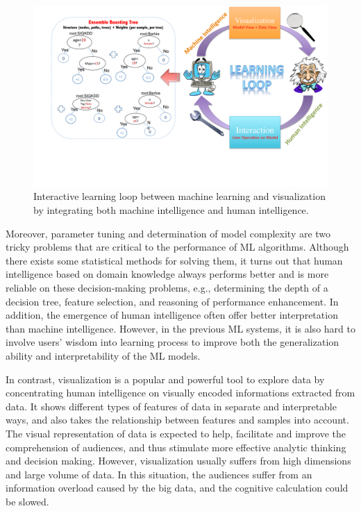 \documentclass{chi2009}
\begin{document}
\begin{figure}[tH!]
\begin{center}
 \includegraphics[width=0.9\linewidth]{loop.pdf}
\end{center}
   \caption{Interactive learning loop between machine learning and visualization by integrating both machine intelligence and human intelligence.}
\label{fig:system}
\end{figure} 

Moreover, parameter tuning and determination of model complexity are two tricky problems that are critical to the performance of ML algorithms. Although there exists some statistical methods for solving them, it turns out that human intelligence based on domain knowledge always performs better and is more reliable on these decision-making problems, e.g., determining the depth of a decision tree, feature selection, and reasoning of performance enhancement. In addition, the emergence of human intelligence often offer better interpretation than machine intelligence. However, in the previous ML systems, it is also hard to involve users’ wisdom into learning process to improve both the generalization ability and interpretability of the ML models. 

In contrast, visualization is a popular and powerful tool to explore data by concentrating human intelligence on visually encoded informations extracted from data. It shows different types of features of data in separate and interpretable ways, and also takes the relationship between features and samples into account. The visual representation of data is expected to help, facilitate and improve the comprehension of audiences, and thus stimulate more effective analytic thinking and decision making. However, visualization usually suffers from high dimensions and large volume of data. In this situation, the audiences suffer from an information overload caused by the big data, and the cognitive calculation could be slowed.
\end{document}
